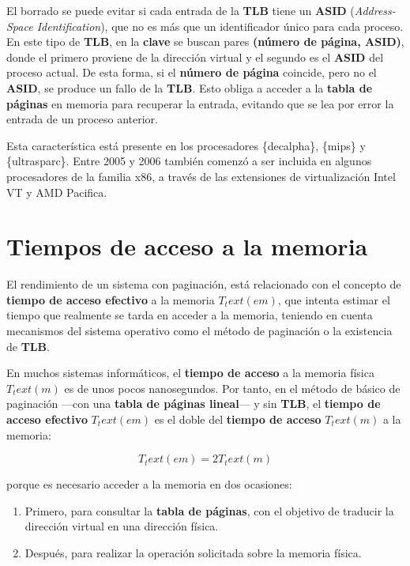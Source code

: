 El borrado se puede evitar si cada entrada de la \textbf{TLB} tiene un
\textbf{{}ASID} (\emph{Address-Space Identification}), que no es más que
un identificador único para cada proceso. En este tipo de \textbf{TLB},
en la \textbf{clave} se buscan pares \textbf{(número de página, ASID)},
donde el primero proviene de la dirección virtual y el segundo es el
\textbf{ASID} del proceso actual. De esta forma, si el \textbf{número de
página} coincide, pero no el \textbf{ASID}, se produce un fallo de la
\textbf{TLB}. Esto obliga a acceder a la \textbf{tabla de páginas} en
memoria para recuperar la entrada, evitando que se lea por error la
entrada de un proceso anterior.

Esta característica está presente en los procesadores \{decalpha\},
\{mips\} y \{ultrasparc\}. Entre 2005 y 2006 también comenzó a ser
incluida en algunos procesadores de la familia x86, a través de las
extensiones de virtualización Intel VT y AMD Pacifica.

\section{Tiempos de acceso a la
memoria}\label{_tiempos_de_acceso_a_la_memoria}

El rendimiento de un sistema con paginación, está relacionado con el
concepto de \textbf{tiempo de acceso efectivo}{} a la memoria
\(T_text(em)\), que intenta estimar el tiempo que realmente se tarda en
acceder a la memoria, teniendo en cuenta mecanismos del sistema
operativo como el método de paginación o la existencia de \textbf{TLB}.

En muchos sistemas informáticos, el \textbf{tiempo de acceso}{} a la
memoria física \(T_text(m)\) es de unos pocos nanosegundos. Por tanto,
en el método de básico de paginación ---con una \textbf{tabla de páginas
lineal}{}--- y sin \textbf{TLB}, el \textbf{tiempo de acceso efectivo}
\(T_text(em)\) es el doble del \textbf{tiempo de acceso} \(T_text(m)\) a
la memoria:

\[T_text(em)=2T_text(m)\]

porque es necesario acceder a la memoria en dos ocasiones:

\begin{enumerate}
\def\labelenumi{\arabic{enumi}.}
\item
  Primero, para consultar la \textbf{tabla de páginas}, con el objetivo
  de traducir la dirección virtual en una dirección física.
\item
  Después, para realizar la operación solicitada sobre la memoria
  física.
\end{enumerate}

